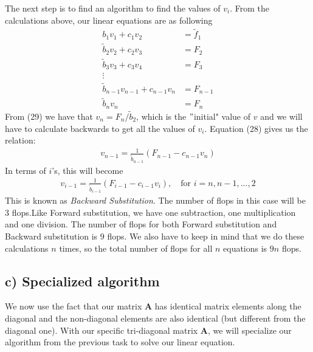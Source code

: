 \documentclass[12pt]{article}
\begin{document}
The next step is to find an algorithm to find the values of $v_i$. From the calculations above, our linear equations are as following
\begin{align}
b_1v_1 + c_1v_2 &= \tilde{f}_1 \\
\tilde{b}_2v_2 + c_2v_3 &= F_2 \\
\tilde{b}_3v_3 + c_3v_4 &= F_3 \\
\vdots \nonumber \\
\tilde{b}_{n-1} v_{n-1} + c_{n-1}v_n &= F_{n-1} \\
\tilde{b}_nv_n &= F_n
\end{align}
From (29) we have that $v_n = F_n/\tilde{b}_2$, which is the $"$initial" value of $v$ and we will have to calculate backwards to get all the values of $v_i$. Equation (28) gives us the relation:
\begin{align*}
v_{n-1} = \frac{1}{\tilde{b}_{n-1}}\left(F_{n-1}-c_{n-1}v_n \right)
\end{align*}
In terms of $i$'s, this will become
\begin{align}
v_{i-1} = \frac{1}{\tilde{b}_{i-1}}\left(F_{i-1} - c_{i-1}v_i \right), \quad \text{for } i = n,n-1,...,2
\end{align}
This is known as \textit{Backward Substitution}. The number of flops in this case will be $3$ flops.Like Forward substitution, we have one subtraction, one multiplication and one division. The number of flops for both Forward substitution and Backward substitution is $9$ flops. We also have to keep in mind that we do these calculations $n$ times, so the total number of flops for all $n$ equations is $9n$ flops.
\subsection*{c) Specialized algorithm}
We now use the fact that our matrix $\mathbf{A}$ has identical matrix elements along the diagonal and the non-diagonal elements are also identical (but different from the diagonal one). With our specific tri-diagonal matrix $\mathbf{A}$, we will specialize our algorithm from the previous task to solve our linear equation.
\end{document}
